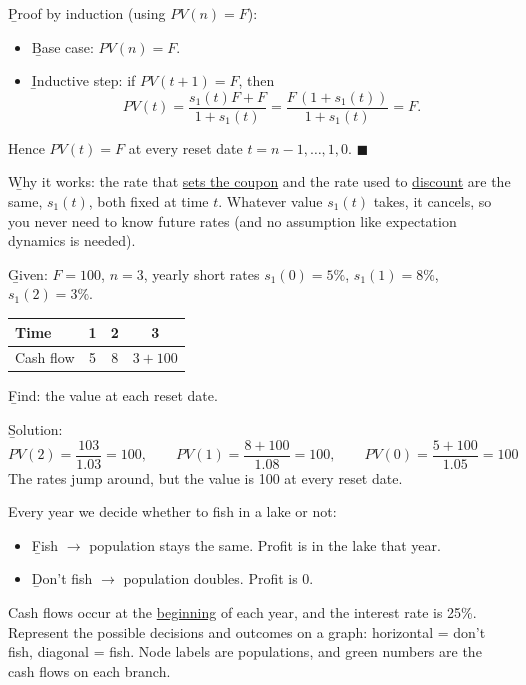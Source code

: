 \b{Proof by induction} (using $PV(n) = F$):
\begin{itemize}
    \item \b{Base case}: $PV(n) = F$.
    \item \b{Inductive step}: if $PV(t+1) = F$, then
    \[PV(t) = \frac{s_1(t)F + F}{1+s_1(t)} = \frac{F\,(1+s_1(t))}{1+s_1(t)} = F.\]
\end{itemize}
Hence $PV(t) = F$ at every reset date $t = n-1, \dots, 1, 0$. $\blacksquare$

\b{Why it works}: the rate that \ul{sets the coupon} and the rate used to \ul{discount} are the same, $s_1(t)$, both fixed at time $t$. Whatever value $s_1(t)$ takes, it cancels, so you never need to know future rates (and no assumption like expectation dynamics is needed).

\begin{example}
    \b{Given}: $F = 100$, $n = 3$, yearly short rates $s_1(0) = 5\%$, $s_1(1) = 8\%$, $s_1(2) = 3\%$.
    \begin{center}
    \begin{tabular}{lccc}
        \toprule
        Time & 1 & 2 & 3\\
        \midrule
        Cash flow & 5 & 8 & $3 + 100$\\
        \bottomrule
    \end{tabular}
    \end{center}
    \b{Find}: the value at each reset date.

    \b{Solution}:
    \[PV(2) = \frac{103}{1.03} = 100, \qquad PV(1) = \frac{8 + 100}{1.08} = 100, \qquad PV(0) = \frac{5 + 100}{1.05} = \boxed{100}\]
    The rates jump around, but the value is 100 at every reset date.
\end{example}


Every year we decide whether to fish in a lake or not:
\begin{itemize}
    \item \b{Fish} $\rightarrow$ population stays the same. Profit is  in the lake that year.
    \item \b{Don't fish} $\rightarrow$ population doubles. Profit is 0.
\end{itemize}
Cash flows occur at the \ul{beginning} of each year, and the interest rate is 25\%. Represent the possible decisions and outcomes on a graph: horizontal = don't fish, diagonal = fish. Node labels are populations, and green numbers are the cash flows on each branch.

